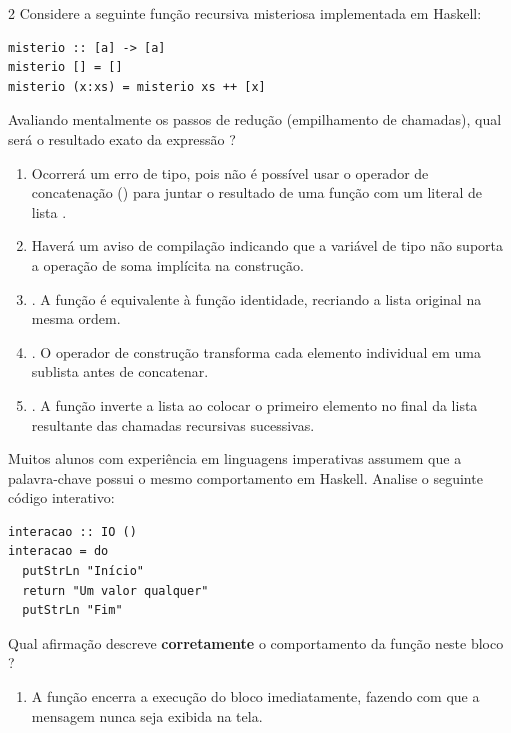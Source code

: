 \documentclass[a4paper,10pt,brazil]{article}
\begin{document}
\begin{multicols}{2}
Considere a seguinte função recursiva misteriosa implementada em Haskell:

\begin{verbatim}
misterio :: [a] -> [a]
misterio [] = []
misterio (x:xs) = misterio xs ++ [x]
\end{verbatim}

Avaliando mentalmente os passos de redução (empilhamento de chamadas), qual será o resultado exato da expressão ?

\begin{enumerate}
  \item Ocorrerá um erro de tipo, pois não é possível usar o operador de concatenação (\haskellinline{++}) para juntar o resultado de uma função com um literal de lista \haskellinline{[x]}.

  \item Haverá um aviso de compilação indicando que a variável de tipo  não suporta a operação de soma implícita na construção.

  \item \haskellinline{[1, 2, 3]}. A função é equivalente à função identidade, recriando a lista original na mesma ordem.

  \item \haskellinline{[[1], [2], [3]]}. O operador de construção transforma cada elemento individual em uma sublista antes de concatenar.

  \item \haskellinline{[3, 2, 1]}. A função inverte a lista ao colocar o primeiro elemento no final da lista resultante das chamadas recursivas sucessivas.


\end{enumerate}

Muitos alunos com experiência em linguagens imperativas assumem que a palavra-chave  possui o mesmo comportamento em Haskell. Analise o seguinte código interativo:

\begin{verbatim}
interacao :: IO ()
interacao = do
  putStrLn "Início"
  return "Um valor qualquer"
  putStrLn "Fim"
\end{verbatim}

Qual afirmação descreve \textbf{corretamente} o comportamento da função  neste bloco ?

\begin{enumerate}
  \item A função  encerra a execução do bloco  imediatamente, fazendo com que a mensagem  nunca seja exibida na tela.


\end{enumerate}
\end{multicols}
\end{document}
